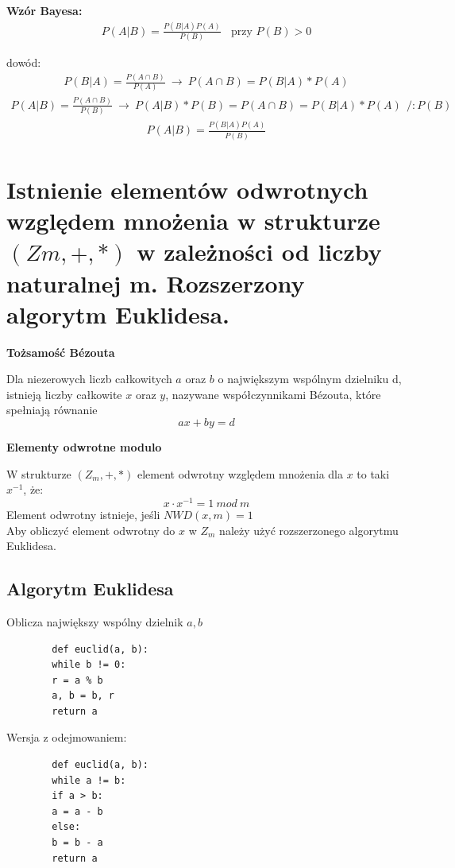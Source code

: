 \documentclass[12pt]{article}
\begin{document}
    \textbf{Wzór Bayesa:}
    \begin{align*}
        P(A|B) = \frac{P(B|A)P(A)}{P(B)} ~ ~ ~ ~ \text{przy $P(B) > 0$}
    \end{align*}

    dowód:
    \begin{align*}
        P(B|A) = \frac{P(A \cap B)}{P(A)} ~ \rightarrow ~ P(A \cap B) = P(B|A) * P(A)
    \end{align*}
    \begin{align*}
        P(A|B) = \frac{P(A \cap B)}{P(B)} ~ \rightarrow ~ P(A|B)* P(B) = P(A \cap B) = P(B|A) * P(A) ~~ /:P(B)
    \end{align*}
    \begin{align*}
        P(A|B) = \frac{P(B|A)P(A)}{P(B)}
    \end{align*}


    \newpage

    \section{Istnienie elementów odwrotnych względem mnożenia w strukturze $(Zm, +, *)$ w zależności od liczby naturalnej m. Rozszerzony algorytm Euklidesa.}

    \begin{theorem}
        \textbf{Tożsamość Bézouta}

        Dla niezerowych liczb całkowitych $a$ oraz $b$ o największym wspólnym dzielniku d, istnieją liczby całkowite $x$ oraz $y$, nazywane współczynnikami Bézouta, które spełniają równanie
        \[ax + by = d\]
    \end{theorem}

    \begin{definition}
        \textbf{Elementy odwrotne modulo}

        W strukturze $(Z_m, +, *)$ element odwrotny względem mnożenia dla $x$ to taki $x^{-1}$, że:
        \[ x \cdot x^{-1} = 1 \  mod \  m \]
        Element odwrotny istnieje, jeśli $NWD(x, m) = 1$\\


        Aby obliczyć element odwrotny do $x$ w $Z_{m}$ należy użyć rozszerzonego algorytmu Euklidesa.
    \end{definition}
    \subsection{Algorytm Euklidesa}
    Oblicza największy wspólny dzielnik $a, b$
    \begin{verbatim}
        def euclid(a, b):
        while b != 0:
        r = a % b
        a, b = b, r
        return a
    \end{verbatim}
    Wersja z odejmowaniem:
    \begin{verbatim}
        def euclid(a, b):
        while a != b:
        if a > b:
        a = a - b
        else:
        b = b - a
        return a
    \end{verbatim}
\end{document}
